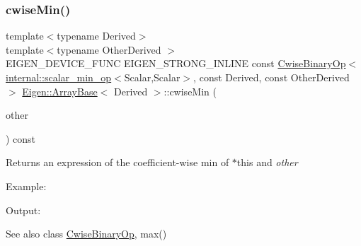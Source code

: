 \subsubsection{\texorpdfstring{cwiseMin()}{cwiseMin()}\hspace{0.1cm}{\footnotesize\ttfamily [1/2]}}
{\footnotesize\ttfamily template$<$typename Derived$>$ \\
template$<$typename Other\+Derived $>$ \\
E\+I\+G\+E\+N\+\_\+\+D\+E\+V\+I\+C\+E\+\_\+\+F\+U\+NC E\+I\+G\+E\+N\+\_\+\+S\+T\+R\+O\+N\+G\+\_\+\+I\+N\+L\+I\+NE const \mbox{\hyperlink{class_eigen_1_1_cwise_binary_op}{Cwise\+Binary\+Op}}$<$\mbox{\hyperlink{struct_eigen_1_1internal_1_1scalar__min__op}{internal\+::scalar\+\_\+min\+\_\+op}}$<$Scalar,Scalar$>$, const Derived, const Other\+Derived$>$ \mbox{\hyperlink{class_eigen_1_1_array_base}{Eigen\+::\+Array\+Base}}$<$ Derived $>$\+::cwise\+Min (\begin{DoxyParamCaption}\item[{const E\+I\+G\+E\+N\+\_\+\+C\+U\+R\+R\+E\+N\+T\+\_\+\+S\+T\+O\+R\+A\+G\+E\+\_\+\+B\+A\+S\+E\+\_\+\+C\+L\+A\+SS$<$ Other\+Derived $>$ \&}]{other }\end{DoxyParamCaption}) const\hspace{0.3cm}{\ttfamily [inline]}}

\begin{DoxyReturn}{Returns}
an expression of the coefficient-\/wise min of $\ast$this and {\itshape other} 
\end{DoxyReturn}
Example\+: 
\begin{DoxyCodeInclude}{0}
\end{DoxyCodeInclude}
 Output\+: 
\begin{DoxyVerbInclude}
\end{DoxyVerbInclude}


\begin{DoxySeeAlso}{See also}
class \mbox{\hyperlink{class_eigen_1_1_cwise_binary_op}{Cwise\+Binary\+Op}}, max() 
\end{DoxySeeAlso}
\mbox{\label{class_eigen_1_1_array_base_ad849f92841311f48355283164344c753}} 
